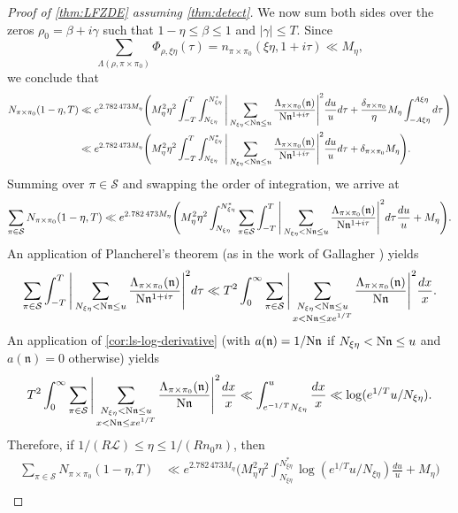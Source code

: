 \documentclass[11pt]{amsart}
\theoremstyle{remark}
\numberwithin{equation}{section}
\newcommand{\kn}{\mathfrak{n}}
\newcommand{\N}{\textnormal{N}}
\begin{document}
\begin{proof}[Proof of \cref{thm:LFZDE} assuming \cref{thm:detect}]
We now sum both sides over the zeros $\rho_0=\beta+i\gamma$ such that $1-\eta\leq \beta\leq 1$ and $|\gamma|\leq T$.  Since
\[
\sum_{\Lambda(\rho,\pi\times\pi_0)}\Phi_{\rho,\xi\eta}(\tau)=n_{\pi\times\pi_0}(\xi\eta,1+i\tau)\ll M_{\eta},
\]
we conclude that
\begin{align*}
N_{\pi\times\pi_0}(1-\eta,T)&\ll e^{2.782\,473 M_{\eta}}\Bigg(M_{\eta}^2 \eta^2\int_{-T}^{T}\int_{N_{\xi\eta}}^{N_{\xi\eta}^*}\Bigg|\sum_{N_{\xi\eta}<\N\kn\leq u}\frac{\Lambda_{\pi\times\pi_0}(\kn)}{\N\kn^{1+i\tau}}\Bigg|^2 \frac{du}{u}d\tau+\frac{\delta_{\pi\times\pi_0}}{\eta}M_{\eta}\int_{-A\xi\eta}^{A\xi\eta} d\tau\Bigg)\\
&\ll e^{2.782\,473 M_{\eta}}\Bigg(M_{\eta}^2 \eta^2\int_{-T}^{T}\int_{N_{\xi\eta}}^{N_{\xi\eta}^*}\Bigg|\sum_{N_{\xi\eta}<\N\kn\leq u}\frac{\Lambda_{\pi\times\pi_0}(\kn)}{\N\kn^{1+i\tau}}\Bigg|^2 \frac{du}{u}d\tau+\delta_{\pi\times\pi_0} M_{\eta}\Bigg).
\end{align*}
Summing over $\pi\in\mathcal{S}$ and swapping the order of integration, we arrive at
\begin{align*}
\sum_{\pi\in\mathcal{S}}N_{\pi\times\pi_0}(1-\eta,T)\ll e^{2.782\,473 M_{\eta}}\Bigg(M_{\eta}^2 \eta^2\int_{N_{\xi\eta}}^{N_{\xi\eta}^*}\sum_{\pi\in\mathcal{S}}\int_{-T}^{T}\Bigg|\sum_{N_{\xi\eta}<\N\kn\leq u}\frac{\Lambda_{\pi\times\pi_0}(\kn)}{\N\kn^{1+i\tau}}\Bigg|^2 d\tau\frac{du}{u}+M_{\eta}\Bigg).
\end{align*}
An application of Plancherel's theorem (as in the work of Gallagher \cite{Gallagher}) yields
\[
\sum_{\pi\in\mathcal{S}}\int_{-T}^{T}\Bigg|\sum_{N_{\xi\eta}<\N\kn\leq u}\frac{\Lambda_{\pi\times\pi_0}(\kn)}{\N\kn^{1+i\tau}}\Bigg|^2 d\tau\ll T^2 \int_0^{\infty}\sum_{\pi\in\mathcal{S}}\Bigg|\sum_{\substack{N_{\xi\eta}<\N\kn\leq u \\ x<\N\kn\leq xe^{1/T}}}\frac{\Lambda_{\pi\times\pi_0}(\kn)}{\N\kn}\Bigg|^2\frac{dx}{x}.
\]
An application of \cref{cor:ls-log-derivative} (with $a(\kn) = 1/\N\kn$ if $N_{\xi\eta}<\N\kn\leq u$ and $a(\kn)=0$ otherwise) yields
\[
T^2 \int_0^{\infty}\sum_{\pi\in\mathcal{S}}\Bigg|\sum_{\substack{N_{\xi\eta}<\N\kn\leq u \\ x<\N\kn\leq xe^{1/T}}}\frac{\Lambda_{\pi\times\pi_0}(\kn)}{\N\kn}\Bigg|^2\frac{dx}{x}\ll \int_{e^{-1/T}N_{\xi\eta}}^{u}\frac{dx}{x}\ll \log(e^{1/T}u/N_{\xi\eta}).
\]
Therefore, if $1/(R\mathcal{L})\leq\eta\leq 1/(R n_0 n)$, then
\begin{align*}
\sum_{\pi\in\mathcal{S}}N_{\pi\times\pi_0}(1-\eta,T)&\ll e^{2.782\,473 M_{\eta}}\Bigg(M_{\eta}^2 \eta^2\int_{N_{\xi\eta}}^{N_{\xi\eta}^*}\log(e^{1/T}u/N_{\xi\eta})\frac{du}{u}+M_{\eta}\Bigg)\\

\end{align*}
\end{proof}
\end{document}
